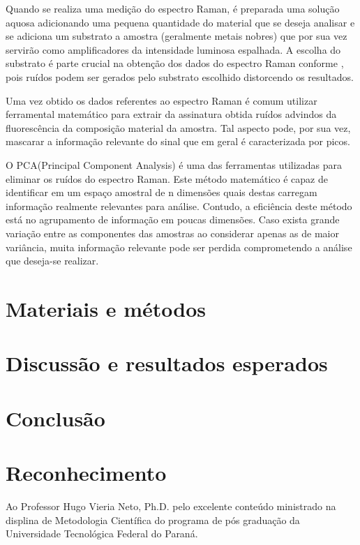 \documentclass[conference,peerreview]{IEEEtran}
\begin{document}
Quando se realiza uma medição do espectro Raman, é preparada uma solução aquosa adicionando uma pequena quantidade do material que se deseja analisar e se adiciona um substrato a amostra (geralmente metais nobres) que por sua vez servirão como amplificadores da intensidade luminosa espalhada. A escolha do substrato é parte crucial na obtenção dos dados do espectro Raman conforme \cite{Seifert2016}, pois ruídos podem ser gerados pelo substrato escolhido distorcendo os resultados.

Uma vez obtido os dados referentes ao espectro Raman é comum utilizar ferramental matemático para extrair da assinatura obtida ruídos advindos da fluorescência da composição material da amostra. Tal aspecto pode, por sua vez, mascarar a informação relevante do sinal que em geral é caracterizada por picos.

O PCA(Principal Component Analysis) é uma das ferramentas utilizadas para eliminar os ruídos do espectro Raman. Este método matemático é capaz de identificar em um espaço amostral de n dimensões quais destas carregam informação realmente relevantes para análise. Contudo, a eficiência deste método está no agrupamento de informação em poucas dimensões. Caso exista grande variação entre as componentes das amostras ao considerar apenas as de maior variância, muita informação relevante pode ser perdida comprometendo a análise que deseja-se realizar.

\section{Materiais e métodos}

\section{Discussão e resultados esperados}

\section{Conclusão}

\section*{Reconhecimento}

Ao Professor Hugo Vieria Neto, Ph.D. pelo excelente conteúdo ministrado na displina de Metodologia Científica do programa de pós graduação da Universidade Tecnológica Federal do Paraná.



\end{document}

